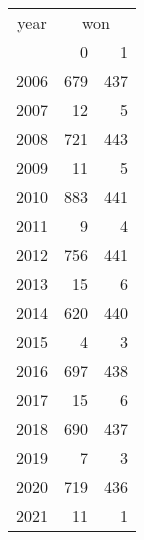 \footnotesize\begin{tabular}[t]{lrr}
\toprule
\multicolumn{1}{c}{year} & \multicolumn{2}{c}{won} \\
\cmidrule(l{3pt}r{3pt}){1-1} \cmidrule(l{3pt}r{3pt}){2-3}
  & 0 & 1\\
\midrule
2006 & 679 & 437\\
2007 & 12 & 5\\
2008 & 721 & 443\\
2009 & 11 & 5\\
2010 & 883 & 441\\
2011 & 9 & 4\\
2012 & 756 & 441\\
2013 & 15 & 6\\
2014 & 620 & 440\\
2015 & 4 & 3\\
2016 & 697 & 438\\
2017 & 15 & 6\\
2018 & 690 & 437\\
2019 & 7 & 3\\
2020 & 719 & 436\\
2021 & 11 & 1\\
\bottomrule
\end{tabular}
